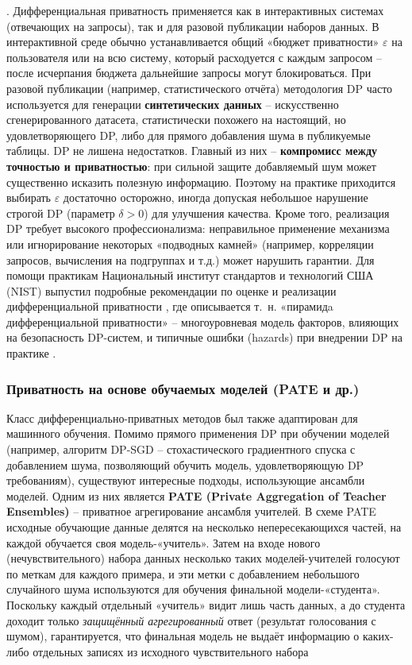 . Дифференциальная приватность применяется как в интерактивных системах (отвечающих на запросы), так и для разовой публикации наборов данных. В интерактивной среде обычно устанавливается общий «бюджет приватности» $\varepsilon$ на пользователя или на всю систему, который расходуется с каждым запросом – после исчерпания бюджета дальнейшие запросы могут блокироваться. При разовой публикации (например, статистического отчёта) методология DP часто используется для генерации \textbf{синтетических данных} – искусственно сгенерированного датасета, статистически похожего на настоящий, но удовлетворяющего DP, либо для прямого добавления шума в публикуемые таблицы. DP не лишена недостатков. Главный из них – \textbf{компромисс между точностью и приватностью}: при сильной защите добавляемый шум может существенно исказить полезную информацию. Поэтому на практике приходится выбирать $\varepsilon$ достаточно осторожно, иногда допуская небольшое нарушение строгой DP (параметр $\delta>0$) для улучшения качества. Кроме того, реализация DP требует высокого профессионализма: неправильное применение механизма или игнорирование некоторых «подводных камней» (например, корреляции запросов, вычисления на подгруппах и т.д.) может нарушить гарантии. Для помощи практикам Национальный институт стандартов и технологий США (NIST) выпустил подробные рекомендации по оценке и реализации дифференциальной приватности
\autocite{nvlpubs-nist-gov}
, где описывается т. н. «пирамидa дифференциальной приватности» – многоуровневая модель факторов, влияющих на безопасность DP-систем, и типичные ошибки (hazards) при внедрении DP на практике
\autocite{nvlpubs-nist-gov}
. \subsubsection{Приватность на основе обучаемых моделей (PATE и др.)}
Класс дифференциально-приватных методов был также адаптирован для машинного обучения. Помимо прямого применения DP при обучении моделей (например, алгоритм DP-SGD – стохастического градиентного спуска с добавлением шума, позволяющий обучить модель, удовлетворяющую DP требованиям), существуют интересные подходы, использующие ансамбли моделей. Одним из них является \textbf{PATE (Private Aggregation of Teacher Ensembles)} – приватное агрегирование ансамбля учителей. В схеме PATE исходные обучающие данные делятся на несколько непересекающихся частей, на каждой обучается своя модель-«учитель». Затем на входе нового (нечувствительного) набора данных несколько таких моделей-учителей голосуют по меткам для каждого примера, и эти метки с добавлением небольшого случайного шума используются для обучения финальной модели-«студента». Поскольку каждый отдельный «учитель» видит лишь часть данных, а до студента доходит только \textit{защищённый агрегированный} ответ (результат голосования с шумом), гарантируется, что финальная модель не выдаёт информацию о каких-либо отдельных записях из исходного чувствительного набора
